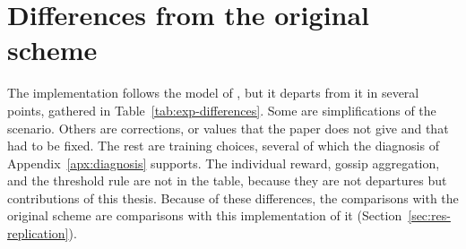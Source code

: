 \section{Differences from the original scheme}
\label{sec:exp-differences}

The implementation follows the model of \citet{li+22fedmarl}, but it departs from it in several points,
gathered in Table~\ref{tab:exp-differences}. Some are simplifications of the scenario. Others are corrections,
or values that the paper does not give and that had to be fixed. The rest are training choices, several of
which the diagnosis of Appendix~\ref{apx:diagnosis} supports. The individual reward, gossip aggregation, and
the threshold rule are not in the table, because they are not departures but contributions of this thesis.
Because of these differences, the comparisons with the original scheme are comparisons with this
implementation of it (Section~\ref{sec:res-replication}).

